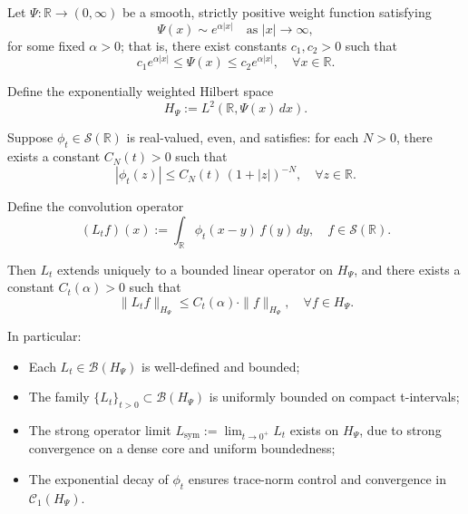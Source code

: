 \begin{proposition}
\label{prop:boundedness-Lt-weighted}
Let \( \Psi \colon \mathbb{R} \to (0,\infty) \) be a smooth, strictly positive weight function satisfying
\[
\Psi(x) \sim e^{\alpha |x|} \quad \text{as } |x| \to \infty,
\]
for some fixed \( \alpha > 0 \); that is, there exist constants \( c_1, c_2 > 0 \) such that
\[
c_1 e^{\alpha |x|} \le \Psi(x) \le c_2 e^{\alpha |x|}, \quad \forall x \in \mathbb{R}.
\]

Define the exponentially weighted Hilbert space
\[
H_\Psi := L^2(\mathbb{R}, \Psi(x)\, dx).
\]

Suppose \( \phi_t \in \mathcal{S}(\mathbb{R}) \) is real-valued, even, and satisfies: for each \( N > 0 \), there exists a constant \( C_N(t) > 0 \) such that
\[
|\phi_t(z)| \le C_N(t)\, (1 + |z|)^{-N}, \quad \forall z \in \mathbb{R}.
\]

Define the convolution operator
\[
(L_t f)(x) := \int_{\mathbb{R}} \phi_t(x - y)\, f(y)\, dy, \quad f \in \mathcal{S}(\mathbb{R}).
\]

Then \( L_t \) extends uniquely to a bounded linear operator on \( H_\Psi \), and there exists a constant \( C_t(\alpha) > 0 \) such that
\[
\| L_t f \|_{H_\Psi} \le C_t(\alpha) \cdot \| f \|_{H_\Psi}, \quad \forall f \in H_\Psi.
\]

In particular:
\begin{itemize}
    \item Each \( L_t \in \mathcal{B}(H_\Psi) \) is well-defined and bounded;
    \item The family \( \{L_t\}_{t > 0} \subset \mathcal{B}(H_\Psi) \) is uniformly bounded on compact t-intervals;
    \item The strong operator limit \( L_{\mathrm{sym}} := \lim_{t \to 0^+} L_t \) exists on \( H_\Psi \), due to strong convergence on a dense core and uniform boundedness;
    \item The exponential decay of \( \phi_t \) ensures trace-norm control and convergence in \( \mathcal{C}_1(H_\Psi) \).
\end{itemize}
\end{proposition}
